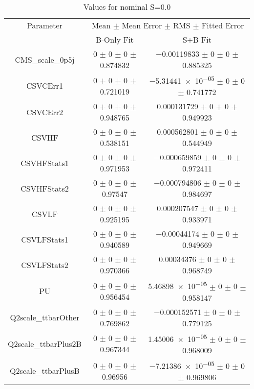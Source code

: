 \begin{table}
\centering
\caption{Values for nominal S=0.0}
\begin{tabular}{ccc}
\toprule
Parameter & \multicolumn{2}{c}{Mean $\pm$ Mean Error $\pm$ RMS $\pm$ Fitted Error}\\
 & B-Only Fit & S+B Fit\\
\midrule
CMS\_scale\_0p5j & \num{0} $\pm$ \num{0} $\pm$ \num{0} $\pm$ \num{0.874832} & \num{-0.00119833} $\pm$ \num{0} $\pm$ \num{0} $\pm$ \num{0.885325}\\
CSVCErr1 & \num{0} $\pm$ \num{0} $\pm$ \num{0} $\pm$ \num{0.721019} & \num{-5.31441e-05} $\pm$ \num{0} $\pm$ \num{0} $\pm$ \num{0.741772}\\
CSVCErr2 & \num{0} $\pm$ \num{0} $\pm$ \num{0} $\pm$ \num{0.948765} & \num{0.000131729} $\pm$ \num{0} $\pm$ \num{0} $\pm$ \num{0.949923}\\
CSVHF & \num{0} $\pm$ \num{0} $\pm$ \num{0} $\pm$ \num{0.538151} & \num{0.000562801} $\pm$ \num{0} $\pm$ \num{0} $\pm$ \num{0.544949}\\
CSVHFStats1 & \num{0} $\pm$ \num{0} $\pm$ \num{0} $\pm$ \num{0.971953} & \num{-0.000659859} $\pm$ \num{0} $\pm$ \num{0} $\pm$ \num{0.972411}\\
CSVHFStats2 & \num{0} $\pm$ \num{0} $\pm$ \num{0} $\pm$ \num{0.97547} & \num{-0.000794806} $\pm$ \num{0} $\pm$ \num{0} $\pm$ \num{0.984697}\\
CSVLF & \num{0} $\pm$ \num{0} $\pm$ \num{0} $\pm$ \num{0.925195} & \num{0.000207547} $\pm$ \num{0} $\pm$ \num{0} $\pm$ \num{0.933971}\\
CSVLFStats1 & \num{0} $\pm$ \num{0} $\pm$ \num{0} $\pm$ \num{0.940589} & \num{-0.00044174} $\pm$ \num{0} $\pm$ \num{0} $\pm$ \num{0.949669}\\
CSVLFStats2 & \num{0} $\pm$ \num{0} $\pm$ \num{0} $\pm$ \num{0.970366} & \num{0.00034376} $\pm$ \num{0} $\pm$ \num{0} $\pm$ \num{0.968749}\\
PU & \num{0} $\pm$ \num{0} $\pm$ \num{0} $\pm$ \num{0.956454} & \num{5.46898e-05} $\pm$ \num{0} $\pm$ \num{0} $\pm$ \num{0.958147}\\
Q2scale\_ttbarOther & \num{0} $\pm$ \num{0} $\pm$ \num{0} $\pm$ \num{0.769862} & \num{-0.000152571} $\pm$ \num{0} $\pm$ \num{0} $\pm$ \num{0.779125}\\
Q2scale\_ttbarPlus2B & \num{0} $\pm$ \num{0} $\pm$ \num{0} $\pm$ \num{0.967344} & \num{1.45006e-05} $\pm$ \num{0} $\pm$ \num{0} $\pm$ \num{0.968009}\\
Q2scale\_ttbarPlusB & \num{0} $\pm$ \num{0} $\pm$ \num{0} $\pm$ \num{0.96956} & \num{-7.21386e-05} $\pm$ \num{0} $\pm$ \num{0} $\pm$ \num{0.969806}\\

\end{tabular}
\end{table}
